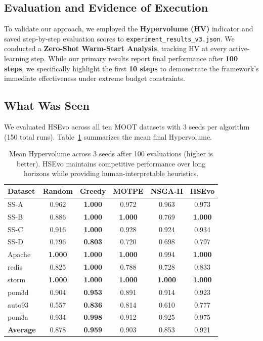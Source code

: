 \documentclass[sigconf,nonacm]{acmart}
\begin{document}
\subsection{Evaluation and Evidence of Execution}
To validate our approach, we employed the \textbf{Hypervolume (HV)} indicator and saved step-by-step evaluation scores to \texttt{experiment\_results\_v3.json}. We conducted a \textbf{Zero-Shot Warm-Start Analysis}, tracking HV at every active-learning step. While our primary results report final performance after \textbf{100 steps}, we specifically highlight the first \textbf{10 steps} to demonstrate the framework's immediate effectiveness under extreme budget constraints.

\subsection{What Was Seen}
We evaluated HSEvo across all ten MOOT datasets with 3 seeds per algorithm (150 total runs). Table~\ref{tab:moot-results} summarizes the mean final Hypervolume.

\begin{table}[h]
\caption{Mean Hypervolume across 3 seeds after 100 evaluations (higher is better). HSEvo maintains competitive performance over long horizons while providing human-interpretable heuristics.}
\label{tab:moot-results}
\begin{tabular}{lccccc}
\toprule
\textbf{Dataset} & \textbf{Random} & \textbf{Greedy} & \textbf{MOTPE} & \textbf{NSGA-II} & \textbf{HSEvo} \\
\midrule
SS-A    & 0.962 & \textbf{1.000} & 0.972 & 0.963 & 0.973 \\
SS-B    & 0.886 & \textbf{1.000} & \textbf{1.000} & 0.769 & \textbf{1.000} \\
SS-C    & 0.916 & \textbf{1.000} & 0.928 & 0.924 & 0.934 \\
SS-D    & 0.796 & \textbf{0.803} & 0.720 & 0.698 & 0.797 \\
Apache  & \textbf{1.000} & \textbf{1.000} & \textbf{1.000} & 0.994 & \textbf{1.000} \\
redis   & 0.825 & \textbf{1.000} & 0.788 & 0.728 & 0.833 \\
storm   & \textbf{1.000} & \textbf{1.000} & \textbf{1.000} & \textbf{1.000} & \textbf{1.000} \\
pom3d   & 0.904 & \textbf{0.953} & 0.891 & 0.914 & 0.923 \\
auto93  & 0.557 & \textbf{0.836} & 0.814 & 0.610 & 0.777 \\
pom3a   & 0.934 & \textbf{0.998} & 0.912 & 0.925 & 0.975 \\
\midrule
\textbf{Average} & 0.878 & \textbf{0.959} & 0.903 & 0.853 & 0.921 \\
\bottomrule
\end{tabular}
\end{table}
\end{document}
